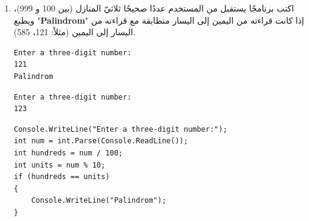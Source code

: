﻿\documentclass[14pt]{extarticle}
\begin{document}
\begin{enumerate}[itemsep=3em]
\item
اكتب برنامجًا يستقبل من المستخدم عددًا صحيحًا ثلاثيّ المنازل (بين 100 و 999)، ويطبع "\textbf{\textenglish{Palindrom}}" إذا كانت قراءته من اليمين إلى اليسار متطابقة مع قراءته من اليسار إلى اليمين (مثلاً: 121، 585).
\ifdetailed
\begin{boxExample}[1]
\begin{english}
\begin{verbatim}
Enter a three-digit number:
121
Palindrom
\end{verbatim}
\end{english}
\end{boxExample}
\begin{boxExample}[2]
\begin{english}
\begin{verbatim}
Enter a three-digit number:
123
\end{verbatim}
\end{english}
\end{boxExample}
\fi
\ifwithsols
\begin{boxSolution}
\begin{english}
\begin{verbatim}
Console.WriteLine("Enter a three-digit number:");
int num = int.Parse(Console.ReadLine());
int hundreds = num / 100;
int units = num % 10;
if (hundreds == units)
{
    Console.WriteLine("Palindrom");
}
\end{verbatim}
\end{english}
\end{boxSolution}
\fi
\clearpage


\end{enumerate}
\end{document}
